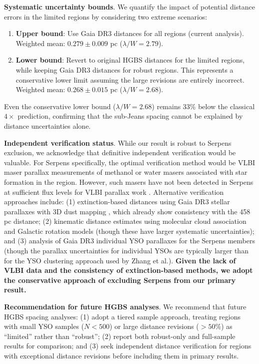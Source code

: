 \documentclass[twoside,twocolumn]{mnras}
\begin{document}
\textbf{Systematic uncertainty bounds}. We quantify the impact of potential distance errors in the limited regions by considering two extreme scenarios:
\begin{enumerate}
    \item \textbf{Upper bound}: Use Gaia DR3 distances for all regions (current analysis). Weighted mean: $0.279 \pm 0.009$ pc ($\lambda/W = 2.79$).
    \item \textbf{Lower bound}: Revert to original HGBS distances for the limited regions, while keeping Gaia DR3 distances for robust regions. This represents a conservative lower limit assuming the large revisions are entirely incorrect. Weighted mean: $0.268 \pm 0.015$ pc ($\lambda/W = 2.68$).
\end{enumerate}
Even the conservative lower bound ($\lambda/W = 2.68$) remains 33\% below the classical $4\times$ prediction, confirming that the sub-Jeans spacing cannot be explained by distance uncertainties alone.

\textbf{Independent verification status}. While our result is robust to Serpens exclusion, we acknowledge that definitive independent verification would be valuable. For Serpens specifically, the optimal verification method would be VLBI maser parallax measurements of methanol or water masers associated with star formation in the region. However, such masers have not been detected in Serpens at sufficient flux levels for VLBI parallax work \citep[see][]{Reid2019}. Alternative verification approaches include: (1) extinction-based distances using Gaia DR3 stellar parallaxes with 3D dust mapping \citep{Yan2022,Green2024}, which already show consistency with the 458 pc distance; (2) kinematic distance estimates using molecular cloud association and Galactic rotation models (though these have larger systematic uncertainties); and (3) analysis of Gaia DR3 individual YSO parallaxes for the Serpens members (though the parallax uncertainties for individual YSOs are typically larger than for the YSO clustering approach used by Zhang et al.). \textbf{Given the lack of VLBI data and the consistency of extinction-based methods, we adopt the conservative approach of excluding Serpens from our primary result.}

\textbf{Recommendation for future HGBS analyses}. We recommend that future HGBS spacing analyses: (1) adopt a tiered sample approach, treating regions with small YSO samples ($N < 500$) or large distance revisions ($>50\%$) as ``limited'' rather than ``robust''; (2) report both robust-only and full-sample results for comparison; and (3) seek independent distance verification for regions with exceptional distance revisions before including them in primary results.
\end{document}
